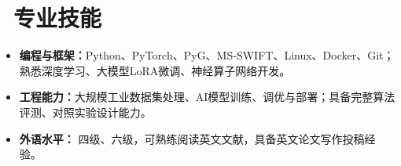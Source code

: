 \documentclass[11pt]{article}
\begin{document}
\section{\makebox[\widthof{\faCogs}][c]{\color{CVBlue}\faCogs}\ 专业技能}
\begin{itemize}
    \item \textbf{编程与框架：}Python、PyTorch、PyG、MS‑SWIFT、Linux、Docker、Git；熟悉深度学习、大模型LoRA微调、神经算子网络开发。
    \item \textbf{工程能力：}大规模工业数据集处理、AI模型训练、调优与部署；具备完整算法评测、对照实验设计能力。
    \item \textbf{外语水平：} 四级、六级，可熟练阅读英文文献，具备英文论文写作投稿经验。
\end{itemize}
\end{document}
